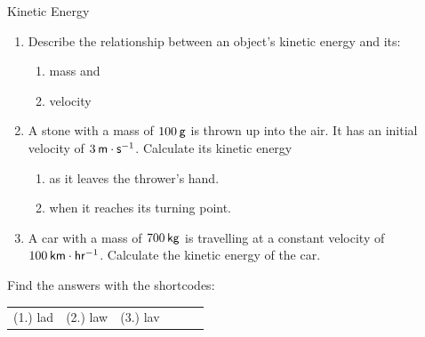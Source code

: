 \begin{exercises}{Kinetic Energy }
            \nopagebreak
        \label{m38785*id68123}\begin{enumerate}[noitemsep, label=\textbf{\arabic*}. ] 
            \label{m38785*uid69}\item Describe the relationship between an object's kinetic energy and its:
\label{m38785*id68139}\begin{enumerate}[noitemsep, label=\textbf{\alph*}. ] 
            \label{m38785*uid70}\item mass and
\label{m38785*uid71}\item velocity
\end{enumerate}
                \label{m38785*uid72}\item A stone with a mass of $100\phantom{\rule{2pt}{0ex}}\mathsf{g}$ is thrown up into the air. It has an initial velocity of $3\phantom{\rule{2pt}{0ex}}\mathsf{m}\ensuremath{\cdot}\mathsf{s}{}^{-1}$. Calculate its kinetic energy
\label{m38785*id68206}\begin{enumerate}[noitemsep, label=\textbf{\alph*}. ] 
            \label{m38785*uid73}\item as it leaves the thrower's hand.
\label{m38785*uid74}\item when it reaches its turning point.
\end{enumerate}
                \label{m38785*uid75}\item A car with a mass of $700\phantom{\rule{2pt}{0ex}}\mathsf{kg}$ is travelling at a constant velocity of $100\phantom{\rule{2pt}{0ex}}\mathsf{km}\ensuremath{\cdot}\mathsf{hr}{}^{-1}$. Calculate the kinetic energy of the car.\newline
\end{enumerate}
  \label{m38785**end}
\par {} Find the answers with the shortcodes:
 \par \begin{tabular}[h]{cccccc}
 (1.) lad  &  (2.) law  &  (3.) lav  & \end{tabular}
\end{exercises}
